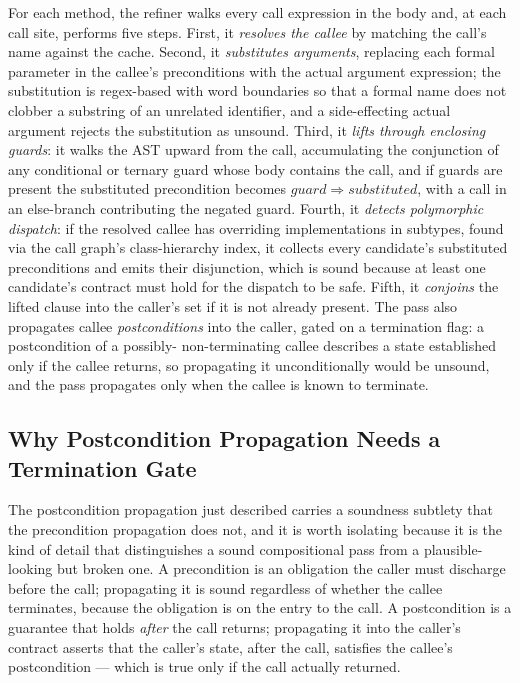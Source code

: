For each method, the refiner walks every call expression in the body and, at
each call site, performs five steps. First, it \emph{resolves the callee} by
matching the call's name against the cache. Second, it \emph{substitutes
arguments}, replacing each formal parameter in the callee's preconditions with
the actual argument expression; the substitution is regex-based with word
boundaries so that a formal name does not clobber a substring of an unrelated
identifier, and a side-effecting actual argument rejects the substitution as
unsound. Third, it \emph{lifts through enclosing guards}: it walks the AST
upward from the call, accumulating the conjunction of any conditional or ternary
guard whose body contains the call, and if guards are present the substituted
precondition becomes $\mathit{guard} \Rightarrow \mathit{substituted}$, with a
call in an else-branch contributing the negated guard. Fourth, it \emph{detects
polymorphic dispatch}: if the resolved callee has overriding implementations in
subtypes, found via the call graph's class-hierarchy index, it collects every
candidate's substituted preconditions and emits their disjunction, which is
sound because at least one candidate's contract must hold for the dispatch to be
safe. Fifth, it \emph{conjoins} the lifted clause into the caller's set if it is
not already present. The pass also propagates callee \emph{postconditions} into
the caller, gated on a termination flag: a postcondition of a possibly-
non-terminating callee describes a state established only if the callee returns,
so propagating it unconditionally would be unsound, and the pass propagates only
when the callee is known to terminate.

\subsection{Why Postcondition Propagation Needs a Termination Gate}

The postcondition propagation just described carries a soundness subtlety that the
precondition propagation does not, and it is worth isolating because it is the kind
of detail that distinguishes a sound compositional pass from a plausible-looking
but broken one. A precondition is an obligation the caller must discharge before
the call; propagating it is sound regardless of whether the callee terminates,
because the obligation is on the entry to the call. A postcondition is a guarantee
that holds \emph{after} the call returns; propagating it into the caller's contract
asserts that the caller's state, after the call, satisfies the callee's
postcondition --- which is true only if the call actually returned.

